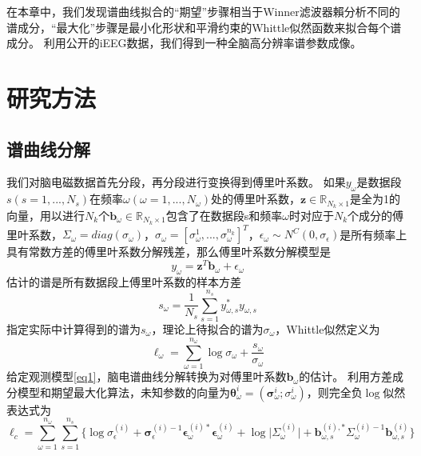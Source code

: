 在本章中，我们发现谱曲线拟合的“期望”步骤相当于Winner滤波器賴分析不同的谱成分，“最大化”步骤是最小化形状和平滑约束的Whittle似然函数来拟合每个谱成分。  利用公开的iEEG数据，我们得到一种全脑高分辨率谱参数成像。

\section{研究方法}
\subsection{谱曲线分解}
我们对脑电磁数据首先分段，再分段进行变换得到傅里叶系数。 如果$y_\omega$是数据段$s(s=1,...,N_s)$在频率$\omega(\omega=1,...,N_\omega)$处的傅里叶系数，$\mathbf{z}\in{\mathbb{R}_{N_k\times{1}}}$是全为1的向量，用以进行$N_k$个$\mathbf{b}_\omega\in{\mathbb{R}_{N_k\times{1}}}$包含了在数据段s和频率$\omega$时对应于$N_k$个成分的傅里叶系数，$\Sigma_\omega=diag(\sigma_\omega)$，$\sigma_\omega=[\sigma_\omega^1,...,\sigma_\omega^{n_k}]^T$，$\epsilon_\omega\sim{N^C(0,\sigma_\epsilon)}$是所有频率上具有常数方差的傅里叶系数分解残差，那么傅里叶系数分解模型是
\begin{equation}\label{eq1}
y_\omega=\mathbf{z}^T\mathbf{b}_\omega+\epsilon_\omega
\end{equation}
估计的谱是所有数据段上傅里叶系数的样本方差
\begin{equation}\label{eq2}
s_\omega=\frac{1}{N_s}\sum_{s=1}^{n_s}y_{\omega,s}^*y_{\omega,s}
\end{equation}
指定实际中计算得到的谱为$s_\omega$，理论上待拟合的谱为$\sigma_\omega$，Whittle似然定义为
\begin{equation}\label{eq3}
\ell_\omega=\sum_{\omega=1}^{n_\omega}\log{\sigma_\omega}+\frac{s_\omega}{\sigma_\omega}
\end{equation}
给定观测模型\eqref{eq1}，脑电谱曲线分解转换为对傅里叶系数$\mathbf{b}_\omega$的估计。 利用方差成分模型和期望最大化算法，未知参数的向量为$\mathbf{\theta}_\omega^{i}=(\mathbf{\sigma}_\omega^{i};\sigma_\omega^{i})$，则完全负$\log$似然表达式为
\begin{equation}\label{eq4}
\ell_c=\sum_{\omega=1}^{n_\omega}\sum_{s=1}^{n_s}\lbrace\log{\sigma}_\epsilon^(i)+\mathbf{\sigma}_\epsilon^{(i)-1}\mathbf{\epsilon}_\omega^{(i)*}\mathbf{\epsilon}_\omega^(i)+\log\lvert\Sigma_\omega^(i)\rvert+\mathbf{b}_{\omega,s}^{(i),*}\Sigma_\omega^{(i)-1}\mathbf{b}_{\omega,s}^(i)\rbrace
\end{equation}

